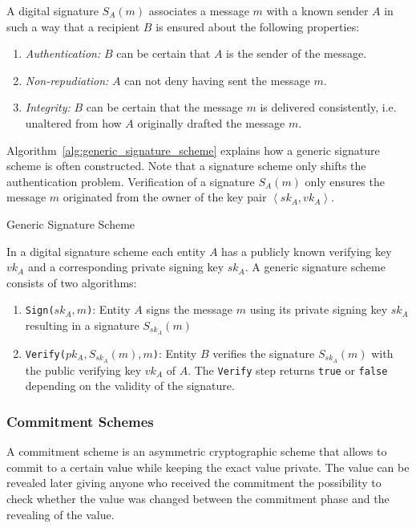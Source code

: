 \begin{defn}
\label{def:digital_signature}
 A digital signature $S_A \left( m \right)$ associates a message $m$ with a known sender $A$ in such a way that a recipient $B$ is ensured about the following properties:
 \begin{enumerate}
  \item \textit{Authentication:} $B$ can be certain that $A$ is the sender of the message.
  \item \textit{Non-repudiation:} $A$ can not deny having sent the message $m$.
  \item \textit{Integrity:} $B$ can be certain that the message $m$ is delivered consistently, i.e. unaltered from how $A$ originally drafted the message $m$.
 \end{enumerate}
\end{defn}

Algorithm~\ref{alg:generic_signature_scheme} explains how a generic signature scheme is often constructed. Note that a signature scheme only shifts the authentication problem. Verification of a signature $S_A \left( m \right)$ only ensures the message $m$ originated from the owner of the key pair $\left< sk_A, vk_A \right>$.
\begin{algorithm}
\caption{Generic Signature Scheme }
\label{alg:generic_signature_scheme}
 \medskip
 In a digital signature scheme each entity $A$ has a publicly known verifying key $vk_A$ and a corresponding private signing key $sk_A$. A generic signature scheme consists of two algorithms:
 \begin{enumerate}
  \item \texttt{Sign($sk_A, m$)}: Entity $A$ signs the message $m$ using its private signing key $sk_A$ resulting in a signature $S_{sk_A} \left( m \right)$
  \item \texttt{Verify($pk_A, S_{sk_A} \left( m \right), m$)}: Entity $B$ verifies the signature $S_{sk_A} \left( m \right)$ with the public verifying key $vk_A$ of $A$. The \texttt{Verify} step returns \texttt{true} or \texttt{false} depending on the validity of the signature.
 \end{enumerate}
\end{algorithm}

\subsubsection{Commitment Schemes}
\label{sec:commitment_schemes}
A commitment scheme is an asymmetric cryptographic scheme that allows to commit to a certain value while keeping the exact value private. The value can be revealed later giving anyone who received the commitment the possibility to check whether the value was changed between the commitment phase and the revealing of the value.

